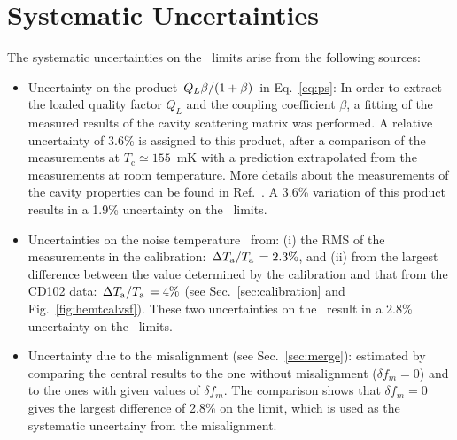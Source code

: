 \section{Systematic Uncertainties} \label{sec:sys}
The systematic uncertainties on the \gagg\ limits arise from the 
following sources:
\begin{itemize}
\item Uncertainty on the product 
$\left.Q_L\beta\middle/\left(1+\beta\right)\right.$ in Eq.~\eqref{eq:ps}: 
In order to extract the loaded quality factor $Q_L$ and the coupling 
coefficient $\beta$, a fitting of the measured results of the cavity 
scattering matrix was performed. A relative uncertainty of 3.6\% is 
assigned to this product, after a comparison of the measurements at 
$T_\text{c}\simeq155$~mK with a prediction extrapolated from the measurements 
at room temperature. More details about the measurements of the 
cavity properties can be found in Ref.~\cite{TASEHInstrumentation}. 
A 3.6\% variation of this product results in a 1.9\% uncertainty 
on the \gagg\ limits. 

\item Uncertainties on the noise temperature \ta\ from: (i) the RMS of 
the measurements in the calibration: 
$\left. \Delta T_\text{a}\middle/T_\text{a}\right.= 2.3\%$,  
%
and (ii) from the largest difference 
between the value determined by the calibration and that from the CD102 
data: $\left. \Delta T_\text{a}\middle/T_\text{a}\right.= 4\%$ 
(see Sec.~\ref{sec:calibration} and Fig.~\ref{fig:hemtcalvsf}). 
These two uncertainties on the \ta\ result in a 2.8\% uncertainty 
on the \gagg\ limits. 

\item Uncertainty due to the misalignment (see Sec.~\ref{sec:merge}):
  estimated by comparing the central results to the one without misalignment
  ($\delta f_m = 0$)
  and to the ones with given values of $\delta f_m$.
  The comparison shows that $\delta f_m = 0$ gives the largest difference 
  of 2.8\% on the limit, which is used as the systematic uncertainy from the 
  misalignment.
  

\end{itemize}
